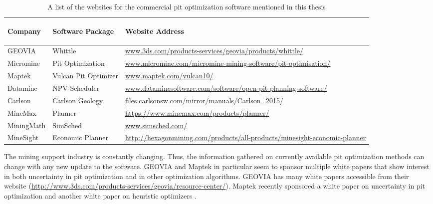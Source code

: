     \begin{table}[!ht]
        \centering
        \begin{tabular}{ | m{2cm} | m{3.5cm} | m{9cm} | }
        \hline
        \begin{center}\textbf{Company}\end{center}  & \begin{center}\textbf{Software Package}\end{center} & \begin{center}\textbf{Website Address}\end{center} \\
        \hline
        GEOVIA      & Whittle           & \url{www.3ds.com/products-services/geovia/products/whittle/} \\
        \hline
        Micromine   & Pit Optimization  & \url{www.micromine.com/micromine-mining-software/pit-optimisation/} \\
        \hline
        Maptek      & Vulcan Pit Optimizer  & \url{www.maptek.com/vulcan10/} \\
        \hline
        Datamine    & NPV-Scheduler     & \url{www.dataminesoftware.com/software/open-pit-planning-software/} \\
        \hline
        Carlson     & Carlson Geology  &  \href{http://files.carlsonsw.com/mirror/manuals/Carlson\_2015/}{files.carlsonsw.com/mirror/manuals/Carlson\_2015/} \\
        \hline
        MineMax     & Planner  & \url{https://www.minemax.com/products/planner/} \\
        \hline
        MiningMath  & SimSched  & \url{www.simsched.com/} \\
        \hline
        MineSight & Economic Planner & \url{http://hexagonmining.com/products/all-products/minesight-economic-planner} \\
        \hline
        \end{tabular}
        \caption[Website of commercial pit optimization software]{A list of the websites for the commercial pit optimization software mentioned in this thesis}
        \label{tab:software}
    \end{table}

    The mining support industry is constantly changing. Thus, the information gathered on currently available pit optimization methods can change with any new update to the software. GEOVIA and Maptek in particular seem to sponsor multiple white papers that show interest in both uncertainty in pit optimization and in other optimization algorithms. GEOVIA has many white papers accessible from their website (\url{http://www.3ds.com/products-services/geovia/resource-center/}). Maptek recently sponsored a white paper on uncertainty in pit optimization \citep{Deutsch2015a} and another white paper on heuristic optimizers \citep{maptek2014}.
